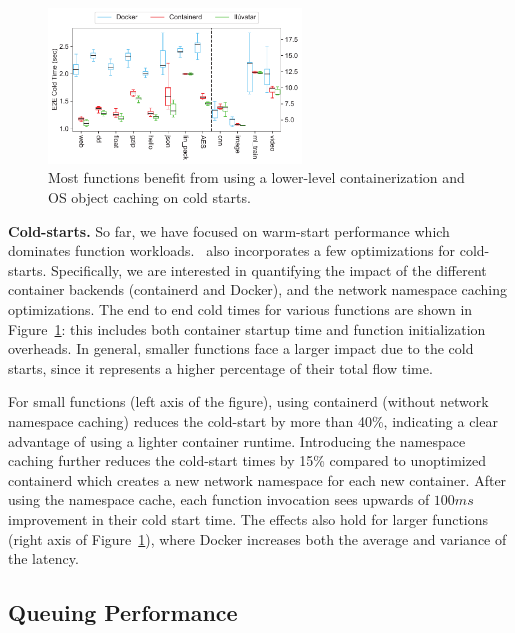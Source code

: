 
\begin{figure}
  \centering
  \includegraphics[width=0.6\textwidth]{iluvatar/graphs/impl/benchmark_cold_e2e.pdf}
  \caption{Most functions benefit from using a lower-level containerization and OS object caching on cold starts.}
  \label{fig:cold}
\end{figure}

\noindent \textbf{Cold-starts.}
So far, we have focused on warm-start performance which dominates function workloads.
\sysname~also incorporates a few optimizations for cold-starts. 
Specifically, we are interested in quantifying the impact of the different container backends (containerd and Docker), and the network namespace caching optimizations. 
The end to end cold times for various functions are shown in Figure~\ref{fig:cold}: this includes both container startup time and function initialization overheads. 
In general, smaller functions face a larger impact due to the cold starts, since it represents a higher percentage of their total flow time. 


For small functions (left axis of the figure), using containerd (without network namespace caching) reduces the cold-start by more than 40\%, indicating a clear advantage of using a lighter container runtime.
Introducing the namespace caching further reduces the cold-start times by 15\% compared to unoptimized containerd which creates a new network namespace for each new container. 
After using the namespace cache, each function invocation sees upwards of $100 ms$ improvement in their cold start time.
%
The effects also hold for larger functions (right axis of Figure~\ref{fig:cold}), where Docker increases both the average and variance of the latency. 

\subsection{Queuing Performance}
\label{sec:eval:q}

